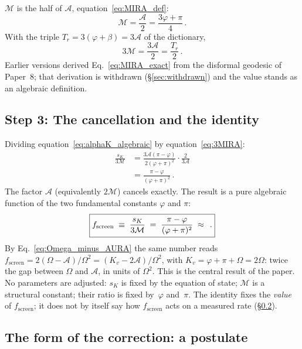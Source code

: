 \documentclass[12pt,a4paper]{article}
\newcommand{\phiG}{\varphi}
\newcommand{\MIRA}{\mathcal{M}}
\newcommand{\AURA}{\mathcal{A}}
\newcommand{\fsc}{f_{\mathrm{screen}}}
\newcommand{\sK}{s_K}          %
\renewcommand{\Omega}{\varOmega}
\begin{document}
$\MIRA$ is the half of $\AURA$, equation~\eqref{eq:MIRA_def}:
\begin{equation}
  \MIRA = \frac{\AURA}{2} = \frac{3\phiG+\pi}{4}\,.
  \label{eq:MIRA_exact}
\end{equation}
With the triple $T_r = 3(\phiG+\beta) = 3\AURA$ of the dictionary,
\begin{equation}
  3\MIRA = \frac{3\AURA}{2} = \frac{T_r}{2}\,.
  \label{eq:3MIRA}
\end{equation}
Earlier versions derived Eq.~\eqref{eq:MIRA_exact} from the disformal geodesic
of Paper~8; that derivation is withdrawn (§\ref{sec:withdrawn}) and the value
stands as an algebraic definition.

\subsection{Step 3: The cancellation and the identity}
\label{sec:step3}

Dividing equation~\eqref{eq:alphaK_algebraic} by equation~\eqref{eq:3MIRA}:
\begin{align}
  \frac{\sK}{3\MIRA}
  &= \frac{3\AURA(\pi-\phiG)}{2(\phiG+\pi)^2}
     \cdot \frac{2}{3\AURA} \nonumber\\
  &= \frac{\pi-\phiG}{(\phiG+\pi)^2}\,.
  \label{eq:cancellation}
\end{align}
The factor $\AURA$ (equivalently $2\MIRA$) cancels exactly.
The result is a pure algebraic function of the two fundamental constants
$\phiG$ and $\pi$:
\begin{equation}
  \boxed{
    \fsc \;\equiv\; \frac{\sK}{3\MIRA}
         \;=\; \frac{\pi-\phiG}{(\phiG+\pi)^2}
         \;\approx\; \val{F_SCREEN_IR_d5}\,.
  }
  \label{eq:fscreen_identity}
\end{equation}
By Eq.~\eqref{eq:Omega_minus_AURA} the same number reads
$\fsc = 2(\Omega-\AURA)/\Omega^2 = (K_v-2\AURA)/\Omega^2$, with
$K_v=\phiG+\pi+\Omega=2\Omega$: twice the gap between $\Omega$ and $\AURA$, in
units of $\Omega^2$.
This is the central result of the paper.
No parameters are adjusted: $\sK$ is fixed by the equation of state;
$\MIRA$ is a structural constant; their ratio is fixed by~$\phiG$ and~$\pi$.
The identity fixes the \emph{value} of $\fsc$; it does not by itself say how
$\fsc$ acts on a measured rate (§\ref{sec:form}).

\subsection{The form of the correction: a postulate}
\label{sec:form}
\end{document}
